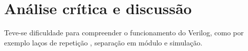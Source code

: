 \chapter{Análise crítica e discussão}
	Teve-se dificuldade para compreender o funcionamento do Verilog, como por exemplo laços de repetição
	, separação em módulo e simulação.


